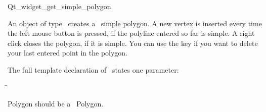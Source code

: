 
\begin{ccRefClass}{Qt_widget_get_simple_polygon}

\ccDefinition
An object of type \ccRefName\ creates a \cgal\ simple polygon.
A new vertex is inserted every time the left mouse button is pressed, if the 
polyline entered so far is simple. A right click closes the polygon, if
it is simple. You can use the  key if you want to delete
your last entered point in the polygon.


\ccParameters

The full template declaration of \ccClassTemplateName\ states one parameter:

\begin{tabbing}
 \=\\
\end{tabbing}

Polygon should be a \cgal\ Polygon.

\ccInheritsFrom
{}
\ccGlue

\ccCreation
{}


\end{ccRefClass}








